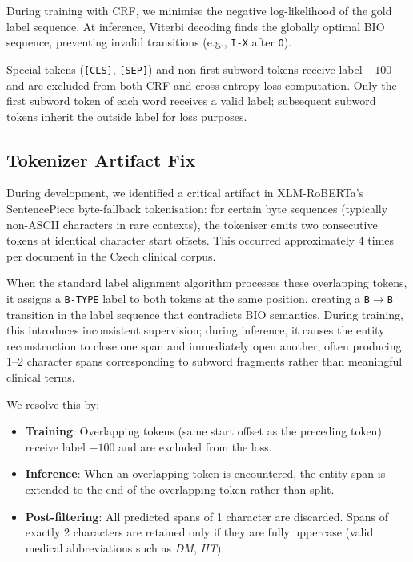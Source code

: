 \documentclass[11pt]{article}
\begin{document}
During training with CRF, we minimise the negative log-likelihood of the gold label
sequence. At inference, Viterbi decoding finds the globally optimal BIO sequence,
preventing invalid transitions (e.g., \texttt{I-X} after \texttt{O}).

Special tokens (\texttt{[CLS]}, \texttt{[SEP]}) and non-first subword tokens receive
label $-100$ and are excluded from both CRF and cross-entropy loss computation.
Only the first subword token of each word receives a valid label; subsequent subword
tokens inherit the outside label for loss purposes.

\subsection{Tokenizer Artifact Fix}

During development, we identified a critical artifact in XLM-RoBERTa's SentencePiece
byte-fallback tokenisation: for certain byte sequences (typically non-ASCII characters in
rare contexts), the tokeniser emits two consecutive tokens at identical character start
offsets. This occurred approximately 4 times per document in the Czech clinical corpus.

When the standard label alignment algorithm processes these overlapping tokens, it assigns
a \texttt{B-TYPE} label to both tokens at the same position, creating a
\texttt{B}$\to$\texttt{B} transition in the label sequence that contradicts BIO semantics.
During training, this introduces inconsistent supervision; during inference, it causes the
entity reconstruction to close one span and immediately open another, often producing 1--2
character spans corresponding to subword fragments rather than meaningful clinical terms.

We resolve this by:
\begin{itemize}
  \item \textbf{Training}: Overlapping tokens (same start offset as the preceding token)
        receive label $-100$ and are excluded from the loss.
  \item \textbf{Inference}: When an overlapping token is encountered, the entity span
        is extended to the end of the overlapping token rather than split.
  \item \textbf{Post-filtering}: All predicted spans of 1 character are discarded.
        Spans of exactly 2 characters are retained only if they are fully uppercase
        (valid medical abbreviations such as \textit{DM}, \textit{HT}).
\end{itemize}
\end{document}
